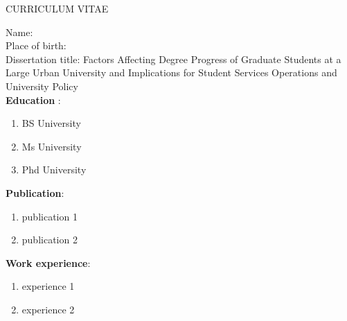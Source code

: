 \newpage
{}

\begin{center}
{\large CURRICULUM VITAE} 
\end{center}
Name:\\ %
Place of birth:\\ %
Dissertation title: Factors Affecting Degree Progress of Graduate Students at a Large Urban University and Implications for Student Services Operations and University Policy \\
\textbf{Education} :
\begin{enumerate}
\item BS University
\item Ms University
\item Phd University
\end{enumerate}
\textbf{Publication}:
\begin{enumerate}
\item publication 1 
\item publication 2
\end{enumerate}
\textbf{Work experience}:
\begin{enumerate}
\item experience 1 
\item experience 2
\end{enumerate}


